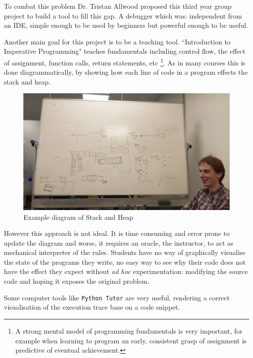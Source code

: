 \documentclass[11pt, a4paper]{article}
\newcommand{\cmd}[1]{{\tt #1}}
\begin{document}
To combat this problem Dr. Tristan Allwood proposed\cite{projectproposal} this third year group project to build a tool to fill this gap.
A debugger which was: independent from an IDE, simple enough to be used by beginners but powerful enough to be useful.

Another main goal for this project is to be a teaching tool.
``Introduction to Imperative Programming" teaches fundamentals including control flow, the effect of assignment, function calls, return statements, etc
\footnote{A strong mental model of programming fundamentals is very important, for example when learning to program an early, consistent grasp of assignment is predictive of eventual achievement\cite{saeed09}.}.
As in many courses this is done diagrammatically, by showing how each line of code in a program effects the stack and heap.

\begin{figure}[h!]
\centering
\includegraphics[width=125mm]{whiteBoardDrawing.jpg}
\caption{Example diagram of Stack and Heap}
\label{fig:boarddiagrams}
\end{figure}

However this approach is not ideal.
It is time consuming and error prone to update the diagram and worse, it requires an oracle, the instructor, to act as mechanical interpreter of the rules.
Students have no way of graphically visualise the state of the programs they write, no easy way to see why their code does not have the effect they expect without \emph{ad hoc} experimentation: modifying the source code and hoping it exposes the original problem.

Some computer tools like \cmd{Python Tutor} \cite{pythontutor} are very useful, rendering a correct visualisation of the execution trace base on a code snippet.
\end{document}
